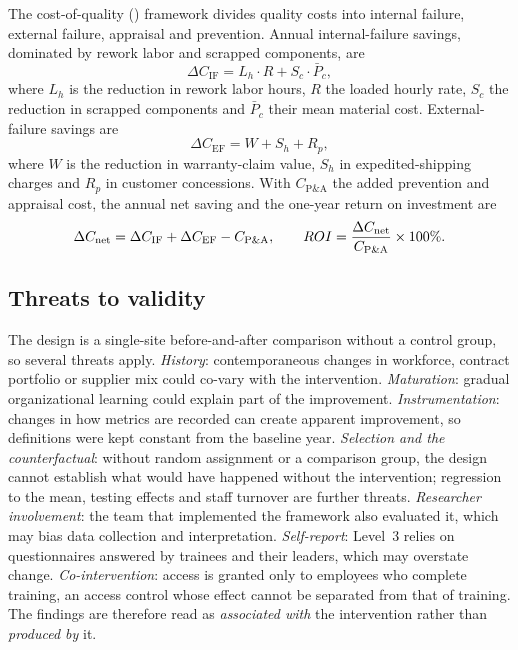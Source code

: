 The cost-of-quality (\CoQ{}) framework divides quality costs into internal failure, external failure, appraisal and prevention. Annual internal-failure savings, dominated by rework labor and scrapped components, are
\begin{equation}
  \Delta C_{\text{IF}} = L_h \cdot R + S_c \cdot \bar{P}_c ,
  \label{eq:internal}
\end{equation}
where $L_h$ is the reduction in rework labor hours, $R$ the loaded hourly rate, $S_c$ the reduction in scrapped components and $\bar{P}_c$ their mean material cost. External-failure savings are
\begin{equation}
  \Delta C_{\text{EF}} = W + S_h + R_p ,
  \label{eq:external}
\end{equation}
where $W$ is the reduction in warranty-claim value, $S_h$ in expedited-shipping charges and $R_p$ in customer concessions. With $C_{\text{P\&A}}$ the added prevention and appraisal cost, the annual net saving and the one-year return on investment are
\begin{equation}
  \Delta C_{\text{net}} = \Delta C_{\text{IF}} + \Delta C_{\text{EF}} - C_{\text{P\&A}} ,
  \qquad
  ROI = \frac{\Delta C_{\text{net}}}{C_{\text{P\&A}}} \times 100\% .
  \label{eq:net}
\end{equation}

\subsection{Threats to validity}
\label{subsec:validity}

The design is a single-site before-and-after comparison without a control group, so several threats apply. \textit{History}: contemporaneous changes in workforce, contract portfolio or supplier mix could co-vary with the intervention. \textit{Maturation}: gradual organizational learning could explain part of the improvement. \textit{Instrumentation}: changes in how metrics are recorded can create apparent improvement, so definitions were kept constant from the baseline year. \textit{Selection and the counterfactual}: without random assignment or a comparison group, the design cannot establish what would have happened without the intervention; regression to the mean, testing effects and staff turnover are further threats. \textit{Researcher involvement}: the team that implemented the framework also evaluated it, which may bias data collection and interpretation. \textit{Self-report}: Level~3 relies on questionnaires answered by trainees and their leaders, which may overstate change. \textit{Co-intervention}: \ERP{} access is granted only to employees who complete training, an access control whose effect cannot be separated from that of training. The findings are therefore read as \emph{associated with} the intervention rather than \emph{produced by} it.
